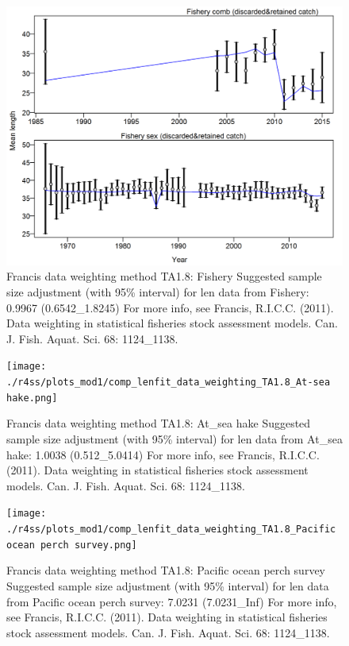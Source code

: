 \documentclass[12pt,]{article}
\begin{document}
\begin{figure}
\centering
\includegraphics{./r4ss/plots_mod1/comp_lenfit_data_weighting_TA1.8_Fishery.png}
\caption{Francis data weighting method TA1.8: Fishery Suggested sample
size adjustment (with 95\% interval) for len data from Fishery: 0.9967
(0.6542\_1.8245) For more info, see Francis, R.I.C.C. (2011). Data
weighting in statistical fisheries stock assessment models. Can. J.
Fish. Aquat. Sci. 68: 1124\_1138. \label{fig:weighting_len_fishery}}
\end{figure}

\begin{figure}
\centering
\texttt{[image: ./r4ss/plots\_mod1/comp\_lenfit\_data\_weighting\_TA1.8\_At-sea hake.png]}
\caption{Francis data weighting method TA1.8: At\_sea hake Suggested
sample size adjustment (with 95\% interval) for len data from At\_sea
hake: 1.0038 (0.512\_5.0414) For more info, see Francis, R.I.C.C.
(2011). Data weighting in statistical fisheries stock assessment models.
Can. J. Fish. Aquat. Sci. 68: 1124\_1138.
\label{fig:weighting_len_ashop}}
\end{figure}

\begin{figure}
\centering
\texttt{[image: ./r4ss/plots\_mod1/comp\_lenfit\_data\_weighting\_TA1.8\_Pacific ocean perch survey.png]}
\caption{Francis data weighting method TA1.8: Pacific ocean perch survey
Suggested sample size adjustment (with 95\% interval) for len data from
Pacific ocean perch survey: 7.0231 (7.0231\_Inf) For more info, see
Francis, R.I.C.C. (2011). Data weighting in statistical fisheries stock
assessment models. Can. J. Fish. Aquat. Sci. 68: 1124\_1138.
\label{fig:weighting_len_pop}}
\end{figure}
\end{document}
